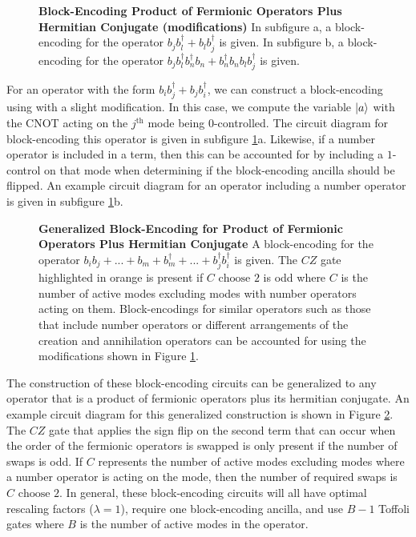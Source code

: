 \begin{figure}
    
    
    \caption{
        \textbf{Block-Encoding Product of Fermionic Operators Plus Hermitian Conjugate (modifications)}
        In subfigure a, a block-encoding for the operator $b_j b_l^\dagger + b_l b_j^\dagger$ is given.
        In subfigure b, a block-encoding for the operator $b_j b_l^\dagger b_n^\dagger b_n + b_n^\dagger b_n b_l b_j^\dagger$ is given.
    }
    \label{fig:fermionic-be-lc-modifications}
\end{figure}

For an operator with the form $b_i b_j^\dagger + b_j b_i^\dagger$, we can construct a block-encoding using with a slight modification.
In this case, we compute the variable $\ket{a}$ with the CNOT acting on the $j^\text{th}$ mode being $0$-controlled.
The circuit diagram for block-encoding this operator is given in subfigure \ref{fig:fermionic-be-lc-modifications}a.
Likewise, if a number operator is included in a term, then this can be accounted for by including a $1$-control on that mode when determining if the block-encoding ancilla should be flipped.
An example circuit diagram for an operator including a number operator is given in subfigure \ref{fig:fermionic-be-lc-modifications}b.

\begin{figure}
    
    \caption{
        \textbf{Generalized Block-Encoding for Product of Fermionic Operators Plus Hermitian Conjugate}
        A block-encoding for the operator $b_i b_j + ... + b_m + b_m^\dagger + ... + b_j^\dagger b_i^\dagger$ is given.
        The $CZ$ gate highlighted in orange is present if $C \text{ choose } 2$ is odd where $C$ is the number of active modes excluding modes with number operators acting on them.
        Block-encodings for similar operators such as those that include number operators or different arrangements of the creation and annihilation operators can be accounted for using the modifications shown in Figure \ref{fig:fermionic-be-lc-modifications}.
    }
    \label{fig:fermionic-be-lc}
\end{figure}

The construction of these block-encoding circuits can be generalized to any operator that is a product of fermionic operators plus its hermitian conjugate.
An example circuit diagram for this generalized construction is shown in Figure \ref{fig:fermionic-be-lc}.
The $CZ$ gate that applies the sign flip on the second term that can occur when the order of the fermionic operators is swapped is only present if the number of swaps is odd.
If $C$ represents the number of active modes excluding modes where a number operator is acting on the mode, then the number of required swaps is $C \text{ choose } 2$.
In general, these block-encoding circuits will all have optimal rescaling factors ($\lambda=1$), require one block-encoding ancilla, and use $B-1$ Toffoli gates where $B$ is the number of active modes in the operator.


